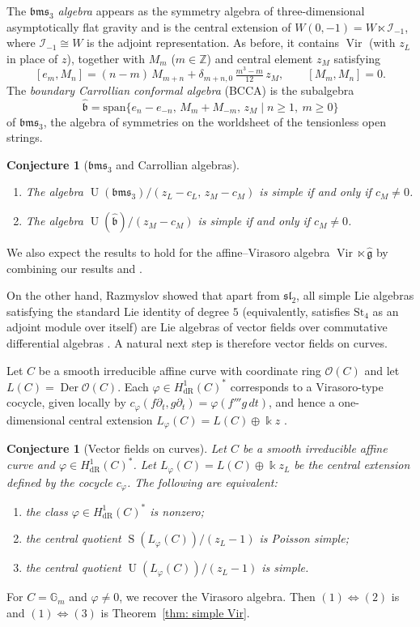 \documentclass[12pt]{amsart}
\theoremstyle{plain}
\newtheorem{conjecture}[theorem]{Conjecture}
\theoremstyle{definition}
\numberwithin{equation}{theorem}
\newcommand{\kk}{\Bbbk}
\newcommand{\Vir}{\operatorname{Vir}}
\newcommand{\Sa}{\operatorname{S}}
\newcommand{\UU}{\operatorname{U}}
\newcommand{\ZZ}{\mathbb{Z}}
\newcommand{\mc}[1]{\mathcal{#1}}
\newcommand{\mf}[1]{\mathfrak{#1}}
\newcommand{\Der}{\operatorname{Der}}
\newcommand{\g}{\mathfrak{g}}
\newcommand{\St}{\mathrm{St}}
\newcommand{\Span}{\mathrm{span}}
\begin{document}
The \emph{$\mathfrak{bms}_3$ algebra} appears as the symmetry algebra of three-dimensional asymptotically flat gravity and is the central extension of $W(0,-1) = W \ltimes \mc{I}_{-1}$, where $\mc{I}_{-1}\cong W$ is the adjoint representation. As before, it contains $\Vir$ (with $z_L$ in place of $z$), together with $M_m$ ($m\in\ZZ$) and central element $z_M$ satisfying
\[
[e_m,M_n]=(n-m)\,M_{m+n}+\delta_{m+n,0}\,\tfrac{m^3-m}{12}\,z_M,\qquad
[M_m,M_n]=0.
\]
The \emph{boundary Carrollian conformal algebra} (BCCA) \cite{BHPTVZ26} is the subalgebra 
\[
\hat{\mf{b}} = \Span \{e_n-e_{-n}, \, M_m+M_{-m}, \,  z_M \mid n \geq 1,\ m \geq 0\}
\]
of $\mf{bms}_3$, the algebra of symmetries on the worldsheet of the tensionless open strings.
\begin{conjecture}[$\mf{bms}_3$ and Carrollian algebras]\label{conj: BMS-BCCA}
\leavevmode
\begin{enumerate}
\item The algebra $\UU(\mf{bms}_3)/(z_L-c_L,\,z_M-c_M)$ is simple if and only if $c_M \neq 0$.
\item The algebra $\UU(\hat{\mf{b}})/(z_M-c_M)$ is simple if and only if $c_M \neq 0$.
\end{enumerate}
\end{conjecture}
We also expect the results to hold for the affine--Virasoro algebra $\Vir \ltimes \hat{\g}$ by combining our results and \cite{BiswalSierra25}.

On the other hand, Razmyslov showed that apart from $\mf{sl}_2$, all simple Lie algebras satisfying the standard Lie identity of degree $5$ (equivalently, satisfies $\St_4$ as an adjoint module over itself) are Lie algebras of vector fields over commutative differential algebras \cite{Razmyslov85}. A natural next step is therefore vector fields on curves. 

Let $C$ be a smooth irreducible affine curve with coordinate ring $\mc{O}(C)$ and let $L(C)=\Der \mc{O}(C)$. Each $\varphi \in H^1_{\mathrm{dR}}(C)^*$ corresponds to a Virasoro-type cocycle, given locally by $c_\varphi(f\partial_t,g\partial_t)=\varphi(f'''g\,dt)$, and hence a
one-dimensional central extension $L_\varphi(C)= L(C) \oplus \kk z$
\cite[Chapter 6]{Schlichenmaier14}.

\begin{conjecture}[Vector fields on curves]\label{conj: curves}
Let $C$ be a smooth irreducible affine curve and $\varphi\in H^1_{\mathrm{dR}}(C)^*$. Let $L_\varphi(C) = L(C) \oplus \kk z_L$ be the central extension defined by the cocycle $c_\varphi$. The following are equivalent:
\begin{enumerate}
    \item the class $\varphi \in H^1_{\mathrm{dR}}(C)^*$ is nonzero;
    \item the central quotient $\Sa(L_\varphi(C))/(z_L-1)$ is Poisson simple;
    \item the central quotient $\UU(L_\varphi(C))/(z_L-1)$ is simple.
\end{enumerate}
\end{conjecture}

For $C= \mathbb{G}_m$ and $\varphi \neq 0$, we recover the Virasoro algebra. Then $(1) \Leftrightarrow (2)$ is \cite[Corollary 3.3.5]{PetukhovSierra2022} and $(1) \Leftrightarrow (3)$ is Theorem~\ref{thm: simple Vir}.



\end{document}
